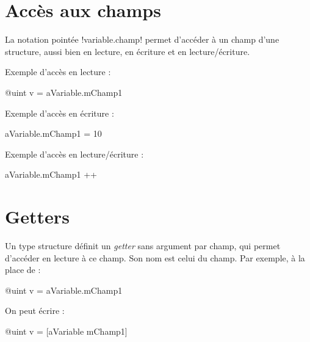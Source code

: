 \section{Accès aux champs}

La notation pointée \ggs!variable.champ! permet d'accéder à un champ d'une structure, aussi bien en lecture, en écriture et en lecture/écriture.

Exemple d'accès en lecture :
\begin{galgas}
@uint v = aVariable.mChamp1
\end{galgas}

Exemple d'accès en écriture :
\begin{galgas}
aVariable.mChamp1 = 10
\end{galgas}


Exemple d'accès en lecture/écriture :
\begin{galgas}
aVariable.mChamp1 ++
\end{galgas}





\section{Getters}

Un type structure définit un \emph{getter} sans argument par champ, qui permet d'accéder en lecture à ce champ. Son nom est celui du champ. Par exemple, à la place de :
\begin{galgas}
@uint v = aVariable.mChamp1
\end{galgas}

On peut écrire :
\begin{galgas}
@uint v = [aVariable mChamp1]
\end{galgas}

